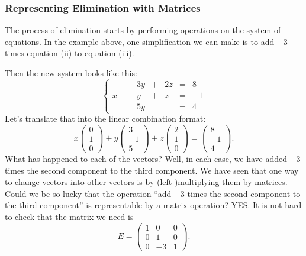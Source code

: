 \documentclass[10pt,]{book}
\theoremstyle{plain}
\theoremstyle{definition}
\numberwithin{equation}{section}
\begin{document}
\subsubsection[Representing Elimination with Matrices]{Representing Elimination with Matrices}\label{subsubsection-14}

        The process of elimination starts by performing operations on the
        system of equations. In the example above, one simplification we can
        make is to add \(-3\) times equation (ii) to equation (iii).
\par

        Then the new system looks like this:
        \[
          \left\{ \begin{array}{rrrrrrr}
          &  &3y &+ &2z &= &8 \\
          x &- & y &+ & z &= &-1 \\
          &  &5y &  &   &= &4
          \end{array}\right.
        \]
        Let's translate that into the linear combination format:
        \[
          x \begin{pmatrix} 0 \\ 1 \\ 0 \end{pmatrix} +
          y \begin{pmatrix} 3 \\ -1 \\ 5 \end{pmatrix} +
          z \begin{pmatrix} 2 \\ 1 \\ 0 \end{pmatrix} =
          \begin{pmatrix} 8 \\ -1 \\ 4 \end{pmatrix} .
        \]
        What has happened to each of the vectors? Well, in each case, we have
        added \(-3\) times the second component to the third component.
        We have seen that one way to change vectors into other vectors is by
        (left-)multiplying them by matrices. Could we be so lucky that the
        operation ``add \(-3\) times the second component to the third
        component'' is representable by a matrix operation? YES. It is not
        hard to check that the matrix we need is
        \[
          E = \begin{pmatrix} 1 &0 &0 \\ 0 &1 &0 \\ 0 &-3 &1 \end{pmatrix} .
        \]
\end{document}

